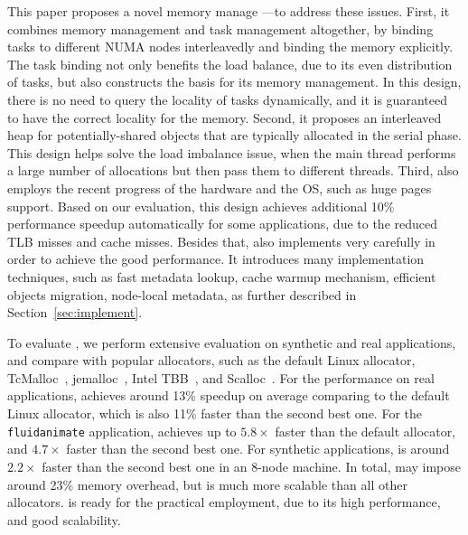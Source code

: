 This paper proposes a novel memory manage --\NM{}--to address these issues. First, it combines memory management and task management altogether, by binding tasks to different NUMA nodes interleavedly and binding the memory explicitly. The task binding not only benefits the load balance, due to its even distribution of tasks, but also constructs the basis for its memory management. In this design, there is no need to query the locality of tasks dynamically, and it is guaranteed to have the correct locality for the memory. Second, it proposes an interleaved heap for potentially-shared objects that are typically allocated in the serial phase. This design helps solve the load imbalance issue, when the main thread performs a large number of allocations but then pass them to different threads.  Third, \NM{} also employs the recent progress of the hardware and the OS, such as huge pages support. Based on our evaluation, this design achieves additional 10\% performance speedup automatically for some applications, due to the reduced TLB misses and cache misses. Besides that, \NM{} also implements very carefully in order to achieve the good performance. It introduces many implementation techniques, such as fast metadata lookup, cache warmup mechanism, efficient objects migration, node-local metadata, as further described in Section~\ref{sec:implement}. 
 



To evaluate \NM{}, we perform extensive evaluation on synthetic and real applications, and compare \NM{} with popular allocators, such as the default Linux allocator, TcMalloc~\cite{tcmalloc}, jemalloc~\cite{jemalloc}, Intel TBB~\cite{tbb}, and Scalloc~\cite{Scalloc}. For the performance on real applications, \NM{} achieves around 13\% speedup on average comparing to the default Linux allocator, which is also 11\% faster than the second best one. For the \texttt{fluidanimate} application, \NM{} achieves up to $5.8\times$ faster than the default allocator, and $4.7\times$ faster than the second best one. For synthetic applications, \NM{} is around $2.2\times$ faster than the second best one in an 8-node machine. In total, \NM{} may impose around 23\% memory overhead, but is much more scalable than all other allocators.  \NM{} is ready for the practical employment, due to its high performance, and good scalability. 


